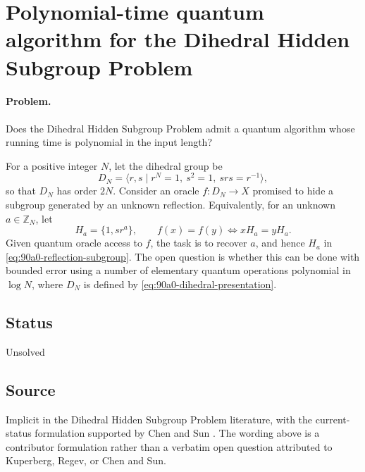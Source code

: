 \section{Polynomial-time quantum algorithm for the Dihedral Hidden Subgroup Problem}
\label{sec:op_90a05e57e44c086e}

\paragraph{Problem.}
Does the Dihedral Hidden Subgroup Problem admit a quantum algorithm whose
running time is polynomial in the input length?

For a positive integer $N$, let the dihedral group be
\begin{equation}
  D_N=\langle r,s\mid r^N=1,\ s^2=1,\ srs=r^{-1}\rangle ,
  \label{eq:90a0-dihedral-presentation}
\end{equation}
so that $D_N$ has order $2N$.  Consider an oracle $f:D_N\to X$ promised to
hide a subgroup generated by an unknown reflection.  Equivalently, for an
unknown $a\in\mathbb Z_N$, let
\begin{equation}
  H_a=\{1,sr^a\},
  \qquad
  f(x)=f(y)\iff xH_a=yH_a .
  \label{eq:90a0-reflection-subgroup}
\end{equation}
Given quantum oracle access to $f$, the task is to recover $a$, and hence
$H_a$ in \eqref{eq:90a0-reflection-subgroup}.  The open question is whether
this can be done with bounded error using a number of elementary quantum
operations polynomial in $\log N$, where $D_N$ is defined by
\eqref{eq:90a0-dihedral-presentation}.

\subsection*{Status}

Unsolved

\subsection*{Source}

Implicit in the Dihedral Hidden Subgroup Problem literature, with
the current-status formulation supported by Chen and Sun
.  The wording above is a contributor
formulation rather than a verbatim open question attributed to Kuperberg,
Regev, or Chen and Sun.

